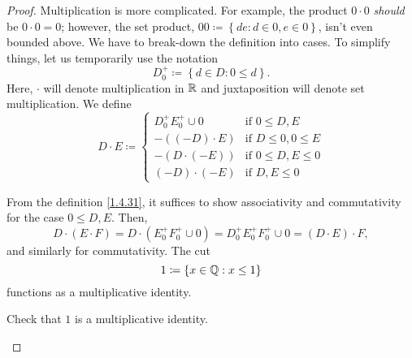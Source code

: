 \begin{thm}
\begin{proof}
Multiplication is more complicated.  For example, the product $0\cdot 0$ \emph{should} be $0\cdot 0=0$; however, the set product, $00\coloneqq \left\{ de:d\in 0,e\in 0\right\}$, isn't even bounded above.  We have to break-down the definition into cases.  To simplify things, let us temporarily use the notation
\begin{equation}
D_0^+\coloneqq \left\{ d\in D:0\leq d\right\} .
\end{equation}
Here, $\cdot$ will denote multiplication in $\mathbb{R}$ and juxtaposition will denote set multiplication.  We define
\begin{equation}\label{1.4.31}
D\cdot E\coloneqq \begin{cases}D_0^+E_0^+\cup 0 & \text{if }0\leq D,E  \\ -\left( (-D)\cdot E\right) & \text{if }D\leq 0,0\leq E \\ -\left( D\cdot (-E)\right) & \text{if }0\leq D,E\leq 0 \\ (-D)\cdot (-E) & \text{if }D,E\leq 0\end{cases}
\end{equation}

From the definition \eqref{1.4.31}, it suffices to show associativity and commutativity for the case $0\leq D,E$.  Then,
\begin{equation}
D\cdot (E\cdot F)=D\cdot \left( E_0^+F_0^+\cup 0\right) =D_0^+E_0^+F_0^+\cup 0=(D\cdot E)\cdot F,
\end{equation}
and similarly for commutativity.  The cut
\begin{equation}
1\coloneqq \left\{ x\in \mathbb{Q} :x\leq 1\right\}
\end{equation}
functions as a multiplicative identity.
\begin{exr}
Check that $1$ is a multiplicative identity.
\end{exr}


\end{proof}
\end{thm}

